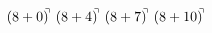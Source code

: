 \documentclass[preview]{standalone}
\begin{document}
\begin{align*}
(8+0)^{\hspace{-0.1cm}\urcorner} \ (8+4)^{\hspace{-0.1cm}\urcorner} \ (8+7)^{\hspace{-0.1cm}\urcorner} \ (8+10)^{\hspace{-0.1cm}\urcorner}
\end{align*}
\end{document}
